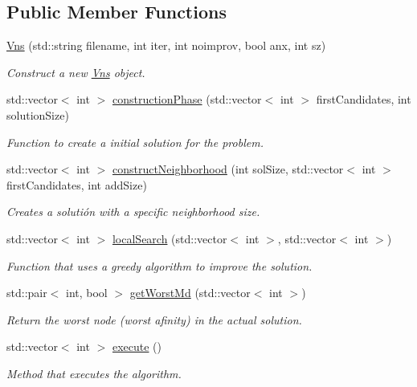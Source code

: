 \subsection*{Public Member Functions}
\begin{DoxyCompactItemize}
\item 
\hyperlink{classVns_a82c0b5f02b3b7c35483e9e0e508e34ae}{Vns} (std\+::string filename, int iter, int noimprov, bool anx, int sz)
\begin{DoxyCompactList}\small\item\em Construct a new \hyperlink{classVns}{Vns} object. \end{DoxyCompactList}\item 
std\+::vector$<$ int $>$ \hyperlink{classVns_aefd9719db68183a6b2ec871c86226ee4}{construction\+Phase} (std\+::vector$<$ int $>$ first\+Candidates, int solution\+Size)
\begin{DoxyCompactList}\small\item\em Function to create a initial solution for the problem. \end{DoxyCompactList}\item 
std\+::vector$<$ int $>$ \hyperlink{classVns_a8eee9f0e31bb41bcd7bd00c46170e5b9}{construct\+Neighborhood} (int sol\+Size, std\+::vector$<$ int $>$ first\+Candidates, int add\+Size)
\begin{DoxyCompactList}\small\item\em Creates a solutión with a specific neighborhood size. \end{DoxyCompactList}\item 
std\+::vector$<$ int $>$ \hyperlink{classVns_aea2dfebed6019c61f7b7405e198d50ab}{local\+Search} (std\+::vector$<$ int $>$, std\+::vector$<$ int $>$)
\begin{DoxyCompactList}\small\item\em Function that uses a greedy algorithm to improve the solution. \end{DoxyCompactList}\item 
std\+::pair$<$ int, bool $>$ \hyperlink{classVns_a2349cd809a0925058a35dea1722c7c23}{get\+Worst\+Md} (std\+::vector$<$ int $>$)
\begin{DoxyCompactList}\small\item\em Return the worst node (worst afinity) in the actual solution. \end{DoxyCompactList}\item 
std\+::vector$<$ int $>$ \hyperlink{classVns_aece2ea2cb74dd3608570321fcbb2de0c}{execute} ()
\begin{DoxyCompactList}\small\item\em Method that executes the algorithm. \end{DoxyCompactList}\end{DoxyCompactItemize}
